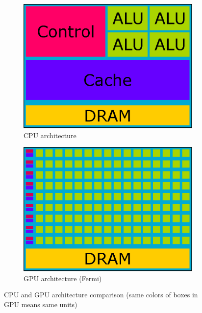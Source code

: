 \begin{figure}[h]
\centering
\begin{subfigure}{.49\textwidth}
  \centering
  \includegraphics[width=1\linewidth]{img/CPUarchitecture.eps}
  \caption{CPU architecture}
  \label{fig:cpuarchitecture}
\end{subfigure}
\begin{subfigure}{.49\textwidth}
  \centering
  \includegraphics[width=1\linewidth]{img/GPUarchitecture.eps}
  \caption{GPU architecture (Fermi)}
  \label{fig:gpuarchitecture}
\end{subfigure}
\caption{CPU and GPU architecture comparison (same colors of boxes in GPU means same units)}
\end{figure}

